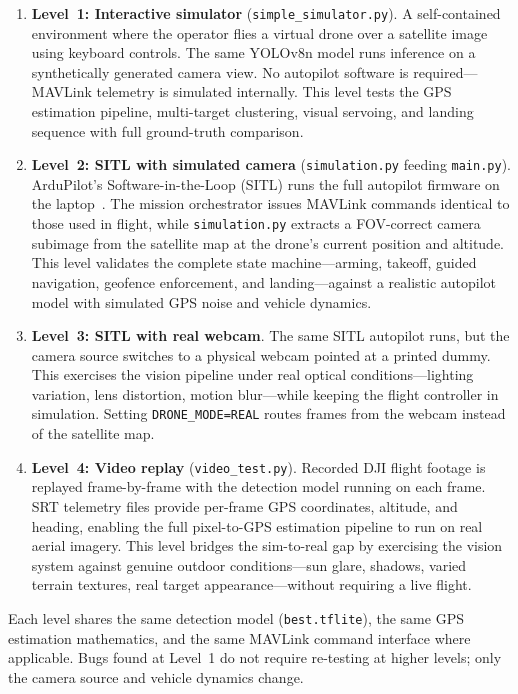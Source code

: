 \begin{enumerate}
    \item \textbf{Level~1: Interactive simulator} (\texttt{simple\_simulator.py}). A self-contained environment where the operator flies a virtual drone over a satellite image using keyboard controls. The same YOLOv8n model runs inference on a synthetically generated camera view. No autopilot software is required---MAVLink telemetry is simulated internally. This level tests the GPS estimation pipeline, multi-target clustering, visual servoing, and landing sequence with full ground-truth comparison.

    \item \textbf{Level~2: SITL with simulated camera} (\texttt{simulation.py} feeding \texttt{main.py}). ArduPilot's Software-in-the-Loop (SITL) runs the full autopilot firmware on the laptop~\cite{ardupilot2024}. The mission orchestrator issues MAVLink commands identical to those used in flight, while \texttt{simulation.py} extracts a FOV-correct camera subimage from the satellite map at the drone's current position and altitude. This level validates the complete state machine---arming, takeoff, guided navigation, geofence enforcement, and landing---against a realistic autopilot model with simulated GPS noise and vehicle dynamics.

    \item \textbf{Level~3: SITL with real webcam}. The same SITL autopilot runs, but the camera source switches to a physical webcam pointed at a printed dummy. This exercises the vision pipeline under real optical conditions---lighting variation, lens distortion, motion blur---while keeping the flight controller in simulation. Setting \texttt{DRONE\_MODE=REAL} routes frames from the webcam instead of the satellite map.

    \item \textbf{Level~4: Video replay} (\texttt{video\_test.py}). Recorded DJI flight footage is replayed frame-by-frame with the detection model running on each frame. SRT telemetry files provide per-frame GPS coordinates, altitude, and heading, enabling the full pixel-to-GPS estimation pipeline to run on real aerial imagery. This level bridges the sim-to-real gap by exercising the vision system against genuine outdoor conditions---sun glare, shadows, varied terrain textures, real target appearance---without requiring a live flight.
\end{enumerate}

Each level shares the same detection model (\texttt{best.tflite}), the same GPS estimation mathematics, and the same MAVLink command interface where applicable. Bugs found at Level~1 do not require re-testing at higher levels; only the camera source and vehicle dynamics change.

